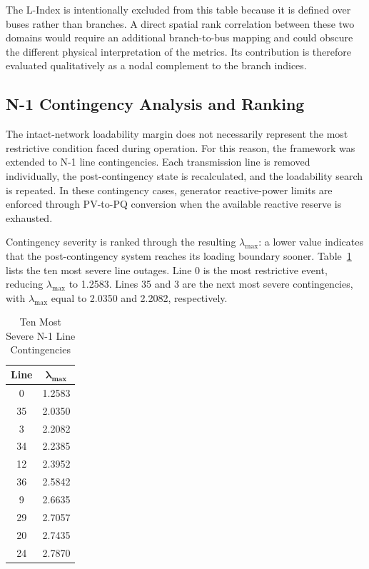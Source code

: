 \documentclass[conference]{IEEEtran}
\begin{document}
The L-Index is intentionally excluded from this table because it is defined over buses rather than branches. A direct spatial rank correlation between these two domains would require an additional branch-to-bus mapping and could obscure the different physical interpretation of the metrics. Its contribution is therefore evaluated qualitatively as a nodal complement to the branch indices.

\subsection{N-1 Contingency Analysis and Ranking}

The intact-network loadability margin does not necessarily represent the most restrictive condition faced during operation. For this reason, the framework was extended to N-1 line contingencies. Each transmission line is removed individually, the post-contingency state is recalculated, and the loadability search is repeated. In these contingency cases, generator reactive-power limits are enforced through PV-to-PQ conversion when the available reactive reserve is exhausted.

Contingency severity is ranked through the resulting $\lambda_{\max}$: a lower value indicates that the post-contingency system reaches its loading boundary sooner. Table~\ref{tab:n1_ranking} lists the ten most severe line outages. Line 0 is the most restrictive event, reducing $\lambda_{\max}$ to 1.2583. Lines 35 and 3 are the next most severe contingencies, with $\lambda_{\max}$ equal to 2.0350 and 2.2082, respectively.

\begin{table}[!t]
\centering
\caption{Ten Most Severe N-1 Line Contingencies}
\label{tab:n1_ranking}
\begin{tabular}{cc}
\toprule
\textbf{Line} & $\bm{\lambda_{\max}}$ \\
\midrule
0  & 1.2583 \\
35 & 2.0350 \\
3 & 2.2082 \\
34  & 2.2385 \\
12  & 2.3952 \\
36  & 2.5842 \\
9 & 2.6635 \\
29 & 2.7057 \\
20  & 2.7435 \\
24 & 2.7870 \\
\bottomrule
\end{tabular}
\end{table}
\end{document}
